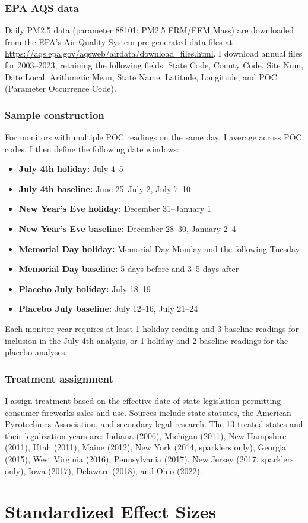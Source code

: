 \documentclass[12pt]{article}
\begin{document}
\subsubsection*{EPA AQS data} Daily PM2.5 data (parameter 88101: PM2.5 FRM/FEM Mass) are downloaded from the EPA's Air Quality System pre-generated data files at \url{https://aqs.epa.gov/aqsweb/airdata/download_files.html}. I download annual files for 2003--2023, retaining the following fields: State Code, County Code, Site Num, Date Local, Arithmetic Mean, State Name, Latitude, Longitude, and POC (Parameter Occurrence Code).

\subsubsection*{Sample construction} For monitors with multiple POC readings on the same day, I average across POC codes. I then define the following date windows:
\begin{itemize}[nosep]
\item \textbf{July 4th holiday:} July 4--5
\item \textbf{July 4th baseline:} June 25--July 2, July 7--10
\item \textbf{New Year's Eve holiday:} December 31--January 1
\item \textbf{New Year's Eve baseline:} December 28--30, January 2--4
\item \textbf{Memorial Day holiday:} Memorial Day Monday and the following Tuesday
\item \textbf{Memorial Day baseline:} 5 days before and 3--5 days after
\item \textbf{Placebo July holiday:} July 18--19
\item \textbf{Placebo July baseline:} July 12--16, July 21--24
\end{itemize}

Each monitor-year requires at least 1 holiday reading and 3 baseline readings for inclusion in the July 4th analysis, or 1 holiday and 2 baseline readings for the placebo analyses.

\subsubsection*{Treatment assignment} I assign treatment based on the effective date of state legislation permitting consumer fireworks sales and use. Sources include state statutes, the American Pyrotechnics Association, and secondary legal research. The 13 treated states and their legalization years are: Indiana (2006), Michigan (2011), New Hampshire (2011), Utah (2011), Maine (2012), New York (2014, sparklers only), Georgia (2015), West Virginia (2016), Pennsylvania (2017), New Jersey (2017, sparklers only), Iowa (2017), Delaware (2018), and Ohio (2022).

\section{Standardized Effect Sizes}
\label{sec:sde}


\end{document}
